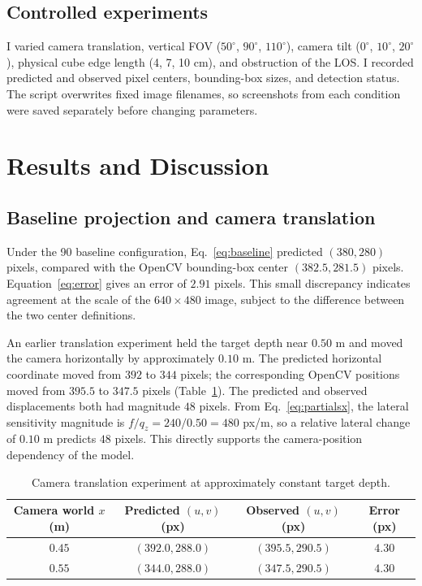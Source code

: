 \documentclass[11pt,letterpaper]{article}
\begin{document}
\subsection{Controlled experiments}
I varied camera translation, vertical FOV ($50^\circ$, $90^\circ$, $110^\circ$), camera tilt ($0^\circ$, $10^\circ$, $20^\circ$), physical cube edge length (4, 7, 10 cm), and obstruction of the LOS. I recorded predicted and observed pixel centers, bounding-box sizes, and detection status. The script overwrites fixed image filenames, so screenshots from each condition were saved separately before changing parameters.


\section{Results and Discussion}
\subsection{Baseline projection and camera translation}
Under the 90\textdegree{} baseline configuration, Eq.~\eqref{eq:baseline} predicted $(380,280)$ pixels, compared with the OpenCV bounding-box center $(382.5,281.5)$ pixels. Equation~\eqref{eq:error} gives an error of $2.91$ pixels. This small discrepancy indicates agreement at the scale of the $640\times480$ image, subject to the difference between the two center definitions.

An earlier translation experiment held the target depth near $0.50$ m and moved the camera horizontally by approximately $0.10$ m. The predicted horizontal coordinate moved from $392$ to $344$ pixels; the corresponding OpenCV positions moved from $395.5$ to $347.5$ pixels (Table~\ref{tab:translation}). The predicted and observed displacements both had magnitude $48$ pixels. From Eq.~\eqref{eq:partialsx}, the lateral sensitivity magnitude is $f/q_z=240/0.50=480$ px/m, so a relative lateral change of $0.10$ m predicts $48$ pixels. This directly supports the camera-position dependency of the model.

\begin{table}[htbp]
\centering\small
\caption{Camera translation experiment at approximately constant target depth.}\label{tab:translation}
\begin{tabular}{@{}cccc@{}}\toprule
Camera world $x$ (m) & Predicted $(u,v)$ (px) & Observed $(u,v)$ (px) & Error (px)\\\midrule
$0.45$ & $(392.0,288.0)$ & $(395.5,290.5)$ & $4.30$\\
$0.55$ & $(344.0,288.0)$ & $(347.5,290.5)$ & $4.30$\\\bottomrule
\end{tabular}
\end{table}
\end{document}
